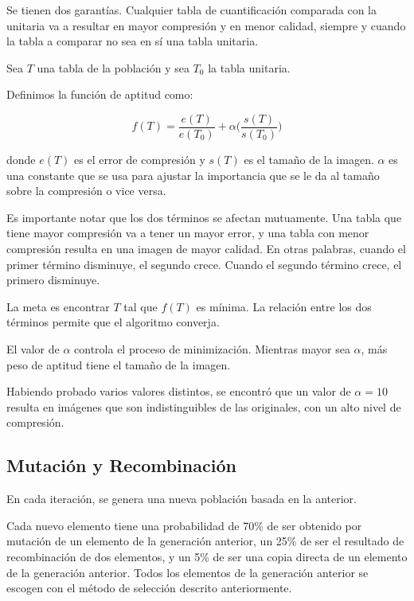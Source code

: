 Se tienen dos garantías. Cualquier tabla de cuantificación comparada con la
unitaria va a resultar en mayor compresión y en menor calidad, siempre y cuando
la tabla a comparar no sea en sí una tabla unitaria.

Sea $T$ una tabla de la población y sea $T_0$ la tabla unitaria.

Definimos la función de aptitud como:

\begin{equation}
f(T) = \frac{e(T)}{e(T_0)} + \alpha \Big(\frac{s(T)}{s(T_0)}\Big)
\end{equation}\label{eq:fitness}

donde $e(T)$ es el error de compresión y $s(T)$ es el tamaño de la
imagen. $\alpha$ es una constante que se usa para ajustar la importancia que se le
da al tamaño sobre la compresión o vice versa.

Es importante notar que los dos términos se afectan mutuamente. Una tabla que tiene mayor
compresión va a tener un mayor error, y una tabla con menor compresión resulta
en una imagen de mayor calidad. En otras palabras, cuando el primer término
disminuye, el segundo crece. Cuando el segundo término crece, el primero
disminuye.

La meta es encontrar $T$ tal que $f(T)$ es mínima. La relación entre los
dos términos permite que el algoritmo converja.

El valor de $\alpha$ controla el proceso de minimización. Mientras mayor sea
$\alpha$, más peso de aptitud tiene el tamaño de la imagen.

Habiendo probado varios valores distintos, se encontró que un valor de $\alpha
= 10$ resulta en imágenes que son indistinguibles de las originales, con un alto
nivel de compresión.

\subsection {Mutación y Recombinación}

En cada iteración, se genera una nueva población basada en la anterior.

Cada nuevo elemento tiene una probabilidad de 70\% de ser obtenido por mutación
de un elemento de la generación anterior, un 25\% de ser el resultado de
recombinación de dos elementos, y un 5\% de ser una copia directa de un
elemento de la generación anterior. Todos los elementos de la generación
anterior se escogen con el método de selección descrito anteriormente.

